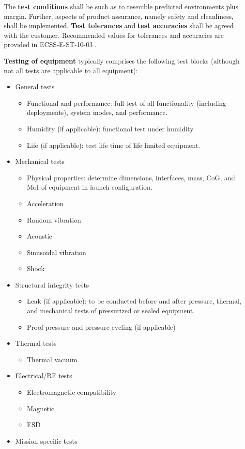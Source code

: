 The \textbf{test conditions} shall be such as to resemble predicted environments plus margin. Further, aspects of product assurance, namely safety and cleanliness, shall be implemented. \textbf{Test tolerances} and \textbf{ test accuracies} shall be agreed with the customer. Recommended values for tolerances and accuracies are provided in ECSS-E-ST-10-03 \cite{ECSS-E-ST-10-03}.

\textbf{Testing of equipment} typically comprises the following test blocks (although not all tests are applicable to all equipment):

\begin{itemize}
\item General tests
	\begin{itemize}
	\item Functional and performance: full test of all functionality (including deployments), system modes, and performance.
	\item Humidity (if applicable): functional test under humidity.
	\item Life (if applicable): test life time of life limited equipment.
	\end{itemize}
\item Mechanical tests
	\begin{itemize}
	\item Physical properties: determine dimensions, interfaces, mass, CoG, and MoI of equipment in launch configuration.
	\item Acceleration
	\item Random vibration
	\item Acoustic
	\item Sinusoidal vibration
	\item Shock
	\end{itemize}
\item Structural integrity tests
	\begin{itemize}
	\item Leak (if applicable): to be conducted before and after pressure, thermal, and mechanical tests of pressurized or sealed equipment.
	\item Proof pressure and pressure cycling (if applicable)
	\end{itemize}
\item Thermal tests
	\begin{itemize}
	\item Thermal vacuum
	\end{itemize}
\item Electrical/RF tests
	\begin{itemize}
	\item Electromagnetic compatibility
	\item Magnetic
	\item ESD
	\end{itemize}
\item Mission specific tests
\end{itemize}

